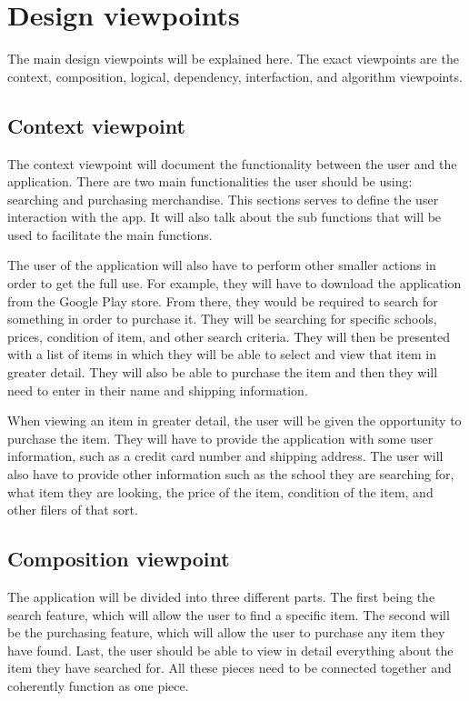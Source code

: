 \documentclass[journal,compsoc, 10pt, draftclsnofoot, onecolumn]{IEEEtran}
\begin{document}
\section{Design viewpoints}
The main design viewpoints will be explained here. The exact viewpoints are the 
context, composition, logical, dependency, interfaction, and algorithm viewpoints.

\subsection{Context viewpoint}
The context viewpoint will document the functionality between the user and the 
application. There are two main functionalities the user should be using: 
searching and purchasing merchandise. This sections serves to define the user 
interaction with the app. It will also talk about the sub functions that will 
be used to facilitate the main functions. \newline

The user of the application will also have to perform other smaller actions in 
order to get the full use. For example, they will have to download the application 
from the Google Play store. From there, they would be required to search for 
something in order to purchase it. They will be searching for specific schools, 
prices, condition of item, and other search criteria. They will then be presented 
with a list of items in which they will be able to select and view that item in 
greater detail. They will also be able to purchase the item and then they will 
need to enter in their name and shipping information. \newline

When viewing an item in greater detail, the user will be given the opportunity 
to purchase the item. They will have to provide the application with some user 
information, such as a credit card number and shipping address. The user will 
also have to provide other information such as the school they are searching 
for, what item they are looking, the price of the item, condition of the item, 
and other filers of that sort.

\subsection{Composition viewpoint}
The application will be divided into three different parts. The first being the 
search feature, which will allow the user to find a specific item. The second 
will be the purchasing feature, which will allow the user to purchase any item 
they have found. Last, the user should be able to view in detail everything 
about the item they have searched for. All these pieces need to be connected 
together and coherently function as one piece. 
\end{document}
